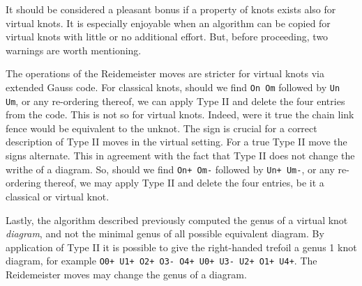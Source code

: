         \par\hfill\par
        It should be considered a pleasant bonus if a property of knots exists
        also for virtual knots. It is especially enjoyable when an
        algorithm can be copied for virtual knots with little or no additional
        effort. But, before proceeding, two warnings are worth mentioning.
        \par\hfill\par
        The operations of the Reidemeister moves are stricter for virtual knots
        via extended Gauss code. For classical knots, should we find
        \texttt{On Om} followed by \texttt{Un Um}, or any re-ordering thereof,
        we can apply Type II and delete the four entries from the code. This is
        not so for virtual knots. Indeed, were it true the chain link fence
        would be equivalent to the unknot. The sign is crucial for a correct
        description of Type II moves in the virtual setting. For a true
        Type II move the signs alternate. This in agreement with the fact that
        Type II does not change the writhe of a diagram. So, should we find
        \texttt{On+ Om-} followed by \texttt{Un+ Um-}, or any re-ordering
        thereof, we may apply Type II and delete the four entries, be it a
        classical or virtual knot.
        \par\hfill\par
        Lastly, the algorithm described previously computed the genus of a
        virtual knot \textit{diagram}, and not the minimal genus of all
        possible equivalent diagram. By application of Type II it is possible
        to give the right-handed trefoil a genus 1 knot diagram, for example
        \texttt{O0+ U1+ O2+ O3- O4+ U0+ U3- U2+ O1+ U4+}. The Reidemeister
        moves may change the genus of a diagram.
